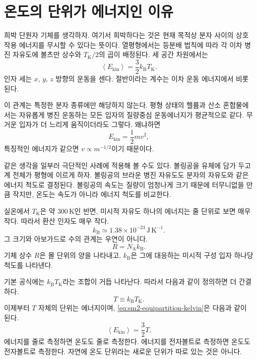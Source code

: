 \section{온도의 단위가 에너지인 이유}

희박 단원자 기체를 생각하자. 여기서 희박하다는 것은 현재 목적상 분자 사이의 상호작용 에너지를 무시할 수 있다는 뜻이다. 열평형에서는 등분배 법칙에 따라 각 이차 병진 자유도에 볼츠만 상수와 \(T_{\mathrm K}/2\)의 곱이 배정된다. 세 공간 차원에서는 \begin{equation}
 \left\langle E_{\mathrm{kin}}\right\rangle
 =\frac{3}{2}k_{\mathrm B}T_{\mathrm K}.
 \label{eq:sm2-equipartition-kelvin}
\end{equation} 인자 세는 \(x\), \(y\), \(z\) 방향의 운동을 센다. 절반이라는 계수는 이차 운동 에너지에서 비롯된다.

이 관계는 특정한 분자 종류에만 해당하지 않는다. 평형 상태의 헬륨과 산소 혼합물에서는 자유롭게 병진 운동하는 모든 입자의 질량중심 운동에너지가 평균적으로 같다. 무거운 입자가 더 느리게 움직이더라도 그렇다. 왜냐하면
\begin{equation}
 E_{\mathrm{kin}}=\frac{1}{2}mv^2,
\end{equation}
특징적인 에너지가 같으면 \(v\propto m^{-1/2}\)이기 때문이다.

같은 생각을 일부러 극단적인 사례에 적용해 볼 수도 있다. 볼링공을 유체에 담가 두고 계 전체가 평형에 이르게 하자. 볼링공의 브라운 병진 자유도도 분자의 자유도와 같은 에너지 척도로 결정된다. 볼링공의 속도는 질량이 엄청나게 크기 때문에 터무니없을 만큼 작지만, 온도는 속도가 아니라 에너지 척도를 비교한다.

실온에서 \(T_{\mathrm K}\)은 약 \(300\,\mathrm K\)인 반면, 미시적 자유도 하나의 에너지는 줄 단위로 보면 매우 작다. 따라서 환산 인자도 매우 작다.
\begin{equation}
 k_{\mathrm B}\simeq 1.38\times10^{-23}\,
 \mathrm{J\,K^{-1}}.
 \label{eq:sm2-boltzmann-value}
\end{equation}
그 크기와 아보가드로 수의 관계는 우연이 아니다.
\begin{equation}
 R=N_{\mathrm A}k_{\mathrm B}.
\end{equation}
기체 상수 \(R\)은 몰 단위의 양을 나타내고, \(k_{\mathrm B}\)은 그에 대응하는 미시적 구성 입자 하나당 척도를 나타낸다.

기본 공식에는 \(k_{\mathrm B}T_{\mathrm K}\)라는 조합이 거듭 나타난다. 따라서 다음과 같이 정의하면 더 간결하다.
\begin{equation}
 T\equiv k_{\mathrm B}T_{\mathrm K}.
 \label{eq:sm2-energy-temperature}
\end{equation}
이제부터 \(T\) 자체의 단위는 에너지이며, \eqref{eq:sm2-equipartition-kelvin}은 다음과 같이 된다.
\begin{equation}
 \left\langle E_{\mathrm{kin}}\right\rangle=\frac{3}{2}T.
 \label{eq:sm2-equipartition-natural}
\end{equation}
에너지를 줄로 측정하면 온도도 줄로 측정한다. 에너지를 전자볼트로 측정하면 온도도 전자볼트로 측정한다. 자연에 온도 단위라는 새로운 단위가 따로 있는 것은 아니다.

